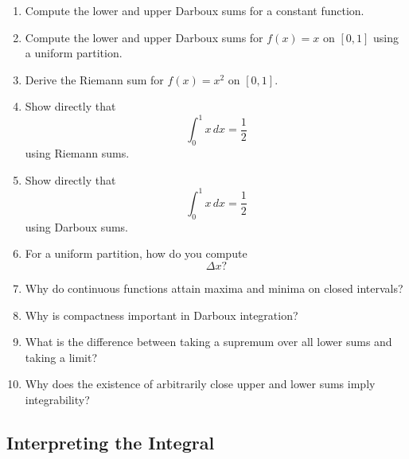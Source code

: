 \begin{enumerate}[resume]
  \item Compute the lower and upper Darboux sums for a constant function.
  \item Compute the lower and upper Darboux sums for $f(x)=x$ on $[0,1]$ using a uniform partition.
  \item Derive the Riemann sum for $f(x)=x^2$ on $[0,1]$.
  \item Show directly that
    \[
      \int_0^1 x\,dx = \frac12
    \]
    using Riemann sums.
  \item Show directly that
    \[
      \int_0^1 x\,dx = \frac12
    \]
    using Darboux sums.
  \item For a uniform partition, how do you compute
    \[
      \Delta x?
    \]
  \item Why do continuous functions attain maxima and minima on closed intervals?
  \item Why is compactness important in Darboux integration?
  \item What is the difference between taking a supremum over all lower sums and taking a limit?
  \item Why does the existence of arbitrarily close upper and lower sums imply integrability?
\end{enumerate}

\subsection{Interpreting the Integral}

